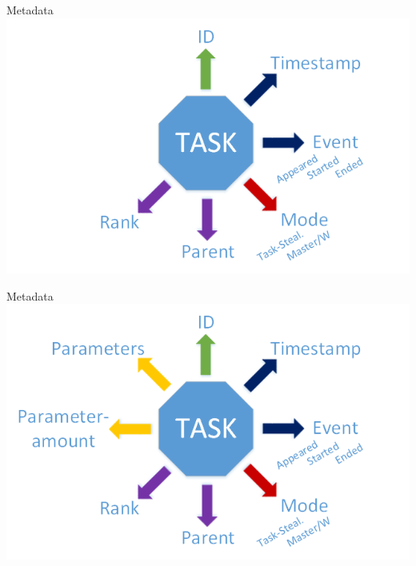 	\begin{frame}{Metadata}
	\includegraphics[width=1.0\textwidth]{images/Task/metadata11.png}
	\end{frame}
	
	\begin{frame}{Metadata}
	\includegraphics[width=1.0\textwidth]{images/Task/metadata1.png}
	\end{frame}
	
